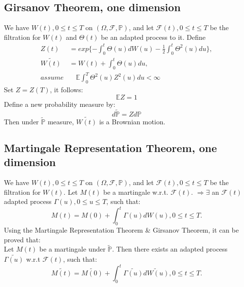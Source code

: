 \documentclass[a4paper, 11pt]{article}
\begin{document}
\subsection{Girsanov Theorem, one dimension}
We have $W(t), 0\leq t \leq T$ on $(\Omega, \mathcal{F}, \mathbb{P})$, and let $\mathcal{F}(t), 0 \leq t \leq T$ be the filtration for $W(t)$ and $\Theta(t)$ be an adapted process to it. Define
\begin{subequations}
\begin{align}
Z(t) &= exp\{-\int_0^t\Theta(u)dW(u) - \frac{1}{2}\int_0^t\Theta^2(u) du\}, \\
\widetilde{W(t)} &= W(t) + \int_0^t\Theta(u)du, \\
assume &\quad \mathbb{E}\int_0^T \Theta^2(u)Z^2(u)du < \infty
\end{align}
\end{subequations}
Set $Z = Z(T)$, it follows:
\begin{equation}
\mathbb{E}Z = 1 
\end{equation}
Define  a new probability measure by:
\begin{equation}
d\widetilde{\mathbb{P}} = Zd\mathbb{P}
\end{equation}
Then under $\widetilde{\mathbb{P}}$ measure, $\widetilde{W(t)}$ is a Brownian motion.

\subsection{Martingale Representation Theorem, one dimension}
We have $W(t), 0\leq t \leq T$ on $(\Omega, \mathcal{F}, \mathbb{P})$, and let $\mathcal{F}(t), 0 \leq t \leq T$ be the filtration for $W(t)$. Let $M(t)$ be a martingale w.r.t. $\mathcal{F}(t)$. 
$\Longrightarrow \exists$ an $\mathcal{F}(t)$ adapted process $\Gamma(u), 0 \leq u \leq T$, such that:
\begin{equation}
M(t) = M(0) + \int_0^t \Gamma(u)dW(u), 0 \leq t \leq T.
\end{equation}
\indent Using the Martingale Representation Theorem \& Girsanov Theorem, it can be proved that: \\
\indent Let $M(t)$ be a martingale under $\widetilde{\mathbb{P}}$. Then there exists an adapted process $\widetilde{\Gamma(u)}$ w.r.t $\mathcal{F}(t)$, such that:
\begin{equation}
\widetilde{M(t)} = \widetilde{M(0)} + \int_0^t \widetilde{\Gamma(u)} \widetilde{dW(u)}, 0 \leq t \leq T.
\end{equation}
\end{document}
